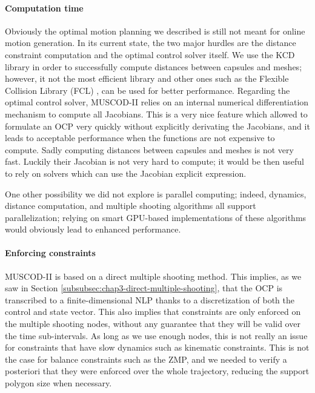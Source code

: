 \paragraph{Computation time}
Obviously the optimal motion planning we described is still not meant
for online motion generation. In its current state, the two major
hurdles are the distance constraint computation and the optimal
control solver itself. We use the KCD library in order to successfully
compute distances between capsules and meshes; however, it not the
most efficient library and other ones such as the Flexible Collision
Library (FCL) \cite{pan2012fcl}, can be used for better
performance. Regarding the optimal control solver, \textsc{MUSCOD-II}
relies on an internal numerical differentiation mechanism to compute
all Jacobians. This is a very nice feature which allowed to formulate
an OCP very quickly without explicitly derivating the Jacobians, and
it leads to acceptable performance when the functions are not
expensive to compute. Sadly computing distances between capsules and
meshes is not very fast. Luckily their Jacobian is not very hard to
compute; it would be then useful to rely on solvers which can use the
Jacobian explicit expression.

One other possibility we did not explore is parallel computing;
indeed, dynamics, distance computation, and multiple shooting
algorithms all support parallelization; relying on smart GPU-based
implementations of these algorithms would obviously lead to enhanced
performance.

\paragraph{Enforcing constraints}
\textsc{MUSCOD-II} is based on a direct multiple shooting\linebreak
method. This implies, as we saw in Section
\ref{subsubsec:chap3-direct-multiple-shooting}, that the OCP is
transcribed to a finite-dimensional NLP thanks to a discretization of
both the control and state vector. This also implies that constraints
are only enforced on the multiple shooting nodes, without any
guarantee that they will be valid over the time sub-intervals. As long
as we use enough nodes, this is not really an issue for constraints
that have slow dynamics such as kinematic constraints. This is not the
case for balance constraints such as the ZMP, and we needed to verify
a posteriori that they were enforced over the whole trajectory,
reducing the support polygon size when necessary.

